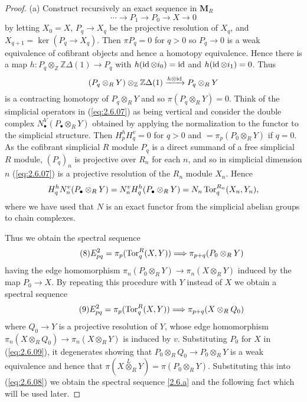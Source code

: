 \documentclass[../main]{subfiles}
\begin{document}
\begin{proof}
(a) Construct recursively an exact sequence in $\mathbf{M}_R$ 
\begin{equation}\tag{7}
\label{eq:2.6.07}
\cdots\longrightarrow P_1\longrightarrow P_0\longrightarrow X\longrightarrow 0
\end{equation}
by letting $X_0=X$, $P_q\longrightarrow X_q$ be the projective resolution of $X_q$, and \\$X_{q+1}=\ker(P_q\longrightarrow X_q)$. Then $\pi P_q=0$ for $q>0$ so $P_q\longrightarrow 0$ is a weak equivalence of cofibrant objects and hence a homotopy equivalence. Hence there is a map $h:P_q\otimes_{\mathbb{Z}}\mathbb{Z}\Delta(1)\longrightarrow P_q$ with $h(\operatorname{id} \otimes i_0)=\operatorname{id} $ and $h(\operatorname{id} \otimes i_1)=0$. Thus \[(P_q\otimes_RY)\otimes_{\mathbb{Z}}\mathbb{Z}\Delta(1)\varrightarrow{h\otimes\id }P_q\otimes_RY\]is a contracting homotopy of $P_q\otimes_RY$ and so $\pi(P_q\otimes_R Y)=0$. Think of the simplicial operators in (\ref{eq:2.6.07}) as being vertical and consider the double complex $N_{\bullet}^V(P_{\bullet}\otimes_RY)$ obtained by applying the normalization to the functor to the simplicial structure. Then $H_p^hH_q^v=0$ for $q>0$ and $=\pi_p(P_{0}\otimes_RY)$ if $q=0$. As the cofibrant simplicial $R$ module $P_q$ is a direct summand of a free simplicial $R$ module, $(P_q)_n$ is projective over $R_n$ for each $n$, and so in simplicial dimension $n$ (\ref{eq:2.6.07}) is a projective resolution of the $R_n$ module $X_n$. Hence \[H_q^hN_n^v(P_{\bullet}\otimes_RY)=N_n^vH_q^h(P_{\bullet}\otimes_RY)=N_n\operatorname{Tor}_q^{R_n}(X_n,Y_n),\]where we have used that $N$ is an exact functor from the simplicial abelian groups to chain complexes.

Thus we obtain the spectral sequence
\begin{equation}\tag{8}
\label{eq:2.6.08}
E_{pq}^2=\pi_p(\operatorname{Tor}_q^R(X,Y))\Longrightarrow\pi_{p+q}(P_{0}\otimes_RY)
\end{equation}
having the edge homomorphism $\pi_n(P_{0}\otimes_RY)\longrightarrow\pi_n(X\otimes_RY)$ induced by the map $P_{0}\longrightarrow X$. By repeating this procedure with $Y$ instead of $X$ we obtain a spectral sequence
\begin{equation}\tag{9}
\label{eq:2.6.09}
E_{pq}^2=\pi_p(\operatorname{Tor}_q^R(X,Y))\Longrightarrow\pi_{p+q}(X\otimes_RQ_{0})
\end{equation}
where $Q_{0}\longrightarrow Y$ is a projective resolution of $Y$, whose edge homomorphism $\pi_n(X\otimes_RQ_{0})\longrightarrow\pi_n(X\otimes_RY)$ is induced by $v$. Substituting $P_{0}$ for $X$ in (\ref{eq:2.6.09}), it degenerates showing that $P_{0}\otimes_RQ_{0}\longrightarrow P_{0}\otimes_RY$ is a weak equivalence and hence that $\pi(X\overset{L}{\otimes}_RY)=\pi(P_{0}\otimes_RY)$. Substituting this into (\ref{eq:2.6.08}) we obtain the spectral sequence \ref{2.6.a} and the following fact which will be used later.


\end{proof}
\end{document}
